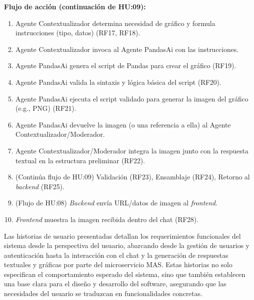 \begin{userstory}[hu:10]
{		\textbf{Flujo de acción (continuación de HU:09):}
		\begin{enumerate}
			\item Agente Contextualizador determina necesidad de gráfico y formula instrucciones (tipo, datos) (RF17, RF18).
			\item Agente Contextualizador invoca al Agente PandasAi con las instrucciones.
			\item Agente PandasAi genera el script de Pandas para crear el gráfico (RF19).
			\item Agente PandasAi valida la sintaxis y lógica básica del script (RF20).
			\item Agente PandasAi ejecuta el script validado para generar la imagen del gráfico (e.g., PNG) (RF21).
			\item Agente PandasAi devuelve la imagen (o una referencia a ella) al Agente Contextualizador/Moderador.
			\item Agente Contextualizador/Moderador integra la imagen junto con la respuesta textual en la estructura preliminar (RF22).
			\item (Continúa flujo de HU:09) Validación (RF23), Ensamblaje (RF24), Retorno al \textit{backend} (RF25).
			\item (Flujo de HU:08) \textit{Backend} envía URL/datos de imagen al \textit{frontend}.
			\item \textit{Frontend} muestra la imagen recibida dentro del chat (RF28).
		\end{enumerate}
	}
	
\end{userstory}

Las historias de usuario presentadas detallan los requerimientos funcionales del sistema desde la perspectiva del usuario, abarcando desde la gestión de usuarios y autenticación hasta la interacción con el chat y la generación de respuestas textuales y gráficas por parte del microservicio MAS. Estas historias no solo especifican el comportamiento esperado del sistema, sino que también establecen una base clara para el diseño y desarrollo del software, asegurando que las necesidades del usuario se traduzcan en funcionalidades concretas.



